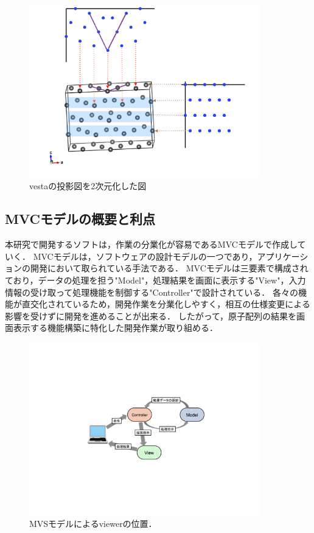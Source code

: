 \begin{figure}[htbp]\begin{center}
\includegraphics[width=10cm,bb= 0 0 737 553]{../figs/./boundary_narita.007.jpeg}
\caption{vestaの投影図を2次元化した図}
\label{default}\end{center}\end{figure}
\subsection{MVCモデルの概要と利点}
本研究で開発するソフトは，作業の分業化が容易であるMVCモデルで作成していく．
MVCモデルは，ソフトウェアの設計モデルの一つであり，アプリケーションの開発において取られている手法である．
MVCモデルは三要素で構成されており，データの処理を担う"Model"，処理結果を画面に表示する"View"，入力情報の受け取って処理機能を制御する"Controller"で設計されている．
各々の機能が直交化されているため，開発作業を分業化しやすく，相互の仕様変更による影響を受けずに開発を進めることが出来る\cite{mvc}．
したがって，原子配列の結果を画面表示する機能構築に特化した開発作業が取り組める．

\begin{figure}[htbp]\begin{center}
\includegraphics[width=10cm,bb= 0 0 737 553]{../figs/./boundary_narita.005.jpeg}
\caption{MVSモデルによるviewerの位置．}
\label{default}\end{center}\end{figure}
